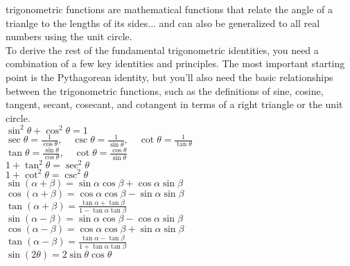 \documentclass{article}
\begin{document}
trigonometric functions are mathematical functions that relate the angle of a trianlge to the lengths of its sides... and can also be generalized to all real numbers using the unit circle.\\

To derive the rest of the fundamental trigonometric identities, you need a combination of a few key identities and principles. The most important starting point is the Pythagorean identity, but you’ll also need the basic relationships between the trigonometric functions, such as the definitions of sine, cosine, tangent, secant, cosecant, and cotangent in terms of a right triangle or the unit circle. \\

$ \sin^2 \theta + \cos^2 \theta = 1 $\\

$ \sec \theta = \frac{1}{\cos \theta}, \quad \csc \theta = \frac{1}{\sin \theta}, \quad \cot \theta = \frac{1}{\tan \theta} $\\

$ \tan \theta = \frac{\sin \theta}{\cos \theta}, \quad \cot \theta = \frac{\cos \theta}{\sin \theta} $\\

$ 1 + \tan^2 \theta = \sec^2 \theta $\\

$ 1 + \cot^2 \theta = \csc^2 \theta $\\

$ \sin(\alpha + \beta) = \sin \alpha \cos \beta + \cos \alpha \sin \beta $\\

$ \cos(\alpha + \beta) = \cos \alpha \cos \beta - \sin \alpha \sin \beta $\\

$ \tan(\alpha + \beta) = \frac{\tan \alpha + \tan \beta}{1 - \tan \alpha \tan \beta} $\\

$ \sin(\alpha - \beta) = \sin \alpha \cos \beta - \cos \alpha \sin \beta $\\

$ \cos(\alpha - \beta) = \cos \alpha \cos \beta + \sin \alpha \sin \beta $\\

$ \tan(\alpha - \beta) = \frac{\tan \alpha - \tan \beta}{1 + \tan \alpha \tan \beta} $\\

$ \sin(2\theta) = 2\sin \theta \cos \theta $\\
\end{document}
